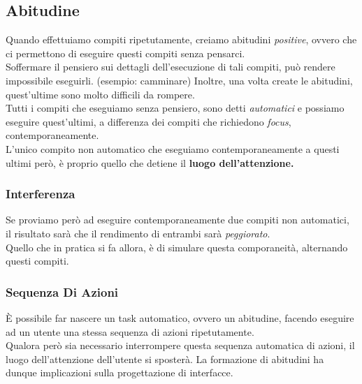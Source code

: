 \documentclass[oneside]{book}
\begin{document}
		\subsection{Abitudine} \label{sec:abitudine}
			Quando effettuiamo compiti ripetutamente, creiamo abitudini \emph{positive}, ovvero che ci permettono di eseguire questi compiti senza pensarci.\\
			Soffermare il pensiero sui dettagli dell'esecuzione di tali compiti, può rendere impossibile eseguirli. (esempio: camminare) Inoltre, una volta create le abitudini, quest'ultime sono molto difficili da rompere. \\

			Tutti i compiti che eseguiamo senza pensiero, sono detti \emph{automatici} e possiamo eseguire quest'ultimi, a differenza dei compiti che richiedono \emph{focus}, contemporaneamente. \\
			L'unico compito non automatico che eseguiamo contemporaneamente a questi ultimi però, è proprio quello che detiene il \textbf{luogo dell'attenzione.} \\

			\subsubsection{Interferenza}
				Se proviamo però ad eseguire contemporaneamente due compiti non automatici, il risultato sarà che il rendimento di entrambi sarà \emph{peggiorato}. \\
				Quello che in pratica si fa allora, è di simulare questa comporaneità, alternando questi compiti. \\

			\subsubsection{Sequenza Di Azioni}
				È possibile far nascere un task automatico, ovvero un abitudine, facendo eseguire ad un utente una stessa sequenza di azioni ripetutamente. \\
				Qualora però sia necessario interrompere questa sequenza automatica di azioni, il luogo dell'attenzione dell'utente si sposterà. La formazione di abitudini ha dunque implicazioni sulla progettazione di interfacce.\\
\end{document}
